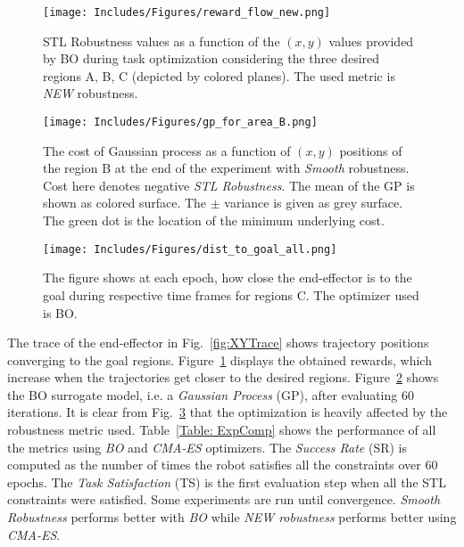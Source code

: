 \documentclass[conference]{IEEEtran}
\begin{document}
\begin{figure}[htbp]
    \centering
    \texttt{[image: Includes/Figures/reward\_flow\_new.png]}
    \caption{STL Robustness values as a function of the $(x,y)$ values provided by BO during task optimization considering the three desired regions A, B, C (depicted by colored planes). The used metric is \emph{NEW} robustness.}
    \label{fig:RewardFlow}
\end{figure}

\begin{figure}[htbp]
    \centering
    \texttt{[image: Includes/Figures/gp\_for\_area\_B.png]}
    \caption{The cost of Gaussian process as a function of $(x, y)$ positions of the region B at the end of the experiment with \emph{Smooth} robustness. Cost here denotes negative \emph{STL Robustness}. The mean of the GP is shown as colored surface. The $\pm$ variance is given as grey surface. The green dot is the location of the minimum underlying cost.}
    \label{fig:GP}
\end{figure}

\begin{figure}[h]
    \centering
    \texttt{[image: Includes/Figures/dist\_to\_goal\_all.png]}
    \caption{The figure shows at each epoch, how close the end-effector is to the goal during respective time frames for regions C. The optimizer used is BO.}
    \label{fig:DistToGoal}
\end{figure}

The trace of the end-effector in Fig.~\ref{fig:XYTrace} shows trajectory positions converging to the goal regions.
Figure~\ref{fig:RewardFlow} displays the obtained rewards, which increase when the trajectories get closer to the desired regions.
Figure~\ref{fig:GP} shows the BO surrogate model, i.e. a \emph{Gaussian Process} (GP), after evaluating $60$ iterations.
It is clear from Fig.~\ref{fig:DistToGoal} that the optimization is heavily affected by the robustness metric used.
Table~\ref{Table: ExpComp} shows the performance of all the metrics using \emph{BO} and \emph{CMA-ES} optimizers.
The \emph{Success Rate} (SR) is computed as the number of times the robot satisfies all the constraints over $60$ epochs.
The \emph{Task Satisfaction} (TS) is the first evaluation step when all the STL constraints were satisfied.
Some experiments are run until convergence.
\emph{Smooth Robustness} performs better with \emph{BO} while \emph{NEW robustness} performs better using \emph{CMA-ES}.
\end{document}
